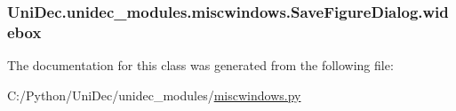 \subsubsection[{widebox}]{\setlength{\rightskip}{0pt plus 5cm}Uni\+Dec.\+unidec\+\_\+modules.\+miscwindows.\+Save\+Figure\+Dialog.\+widebox}\label{class_uni_dec_1_1unidec__modules_1_1miscwindows_1_1_save_figure_dialog_a0a730715967ba81f0c9d4cf6b19d175b}


The documentation for this class was generated from the following file\+:\begin{DoxyCompactItemize}
\item 
C\+:/\+Python/\+Uni\+Dec/unidec\+\_\+modules/\hyperlink{miscwindows_8py}{miscwindows.\+py}\end{DoxyCompactItemize}

